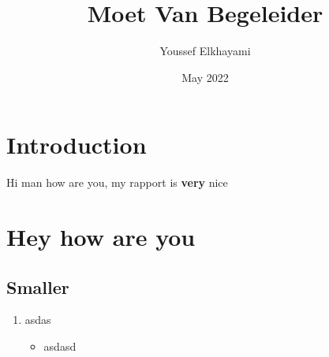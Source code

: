 \documentclass{article}
\title{Moet Van Begeleider}
\author{Youssef Elkhayami}
\date{May 2022}
\begin{document}
\maketitle

\section{Introduction}

Hi man how are you, my rapport is \textbf{very} nice

\section{Hey how are you}

\subsection{Smaller}
\begin{enumerate}
\item asdas
\begin{itemize}
\item asdasd
\end{itemize}
\end{enumerate}
\end{document}
